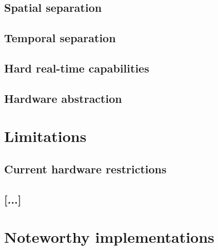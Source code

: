 \subsection{Spatial separation}
\subsection{Temporal separation}
\subsection{Hard real-time capabilities}
\subsection{Hardware abstraction}


\section{Limitations}
\subsection{Current hardware restrictions}
\subsection{[...]}


\section{Noteworthy implementations}
